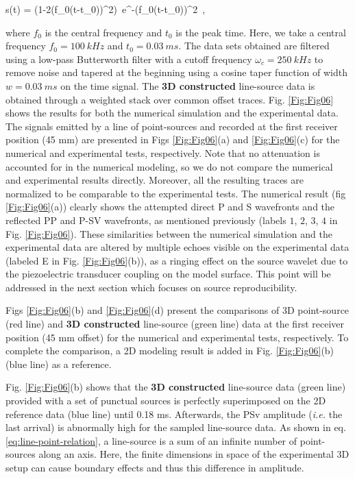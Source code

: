 \documentclass[extra,mreferee]{gji}
\newenvironment{violetnote}{\par\color{BlueViolet}}{\par}
\begin{document}
\begin{violetnote}
\equation
s(t) = (1-2(\pi f_{0}(t-t_{0}))^{2})~e^{-(\pi f_{0}(t-t_{0}))^{2}}~,
\label{eq:ricker-source} 
\endequation

where $f_{0}$ is the central frequency and $t_{0}$ is the peak time. Here, we take a central frequency $f_{0}=100\ kHz$ and $t_{0}=0.03\ ms$. The data sets obtained are filtered using a low-pass Butterworth filter with a cutoff frequency $\omega_{c}=250\ kHz$ to remove noise and tapered at the beginning using a cosine taper function of width $w=0.03\ ms$ on the time signal. The \textbf{3D constructed} line-source data is obtained through a weighted stack over common offset traces. Fig. \ref{Fig:Fig06} shows the results for both the numerical simulation and the experimental data. The signals emitted by a line of point-sources and recorded at the first receiver position (45 mm) are presented in Figs \ref{Fig:Fig06}(a) and \ref{Fig:Fig06}(c) for the numerical and experimental tests, respectively. Note that no attenuation is accounted for in the numerical modeling, so we do not compare the numerical and experimental results directly. Moreover, all the resulting traces are normalized to be comparable to the experimental tests. The numerical result (fig \ref{Fig:Fig06}(a)) clearly shows the attempted direct P and S wavefronts and the reflected PP and P-SV wavefronts, as mentioned previously (labels $1$, $2$, $3$, $4$ in Fig. \ref{Fig:Fig06}). These similarities between the numerical simulation and the experimental data are altered by multiple echoes visible on the experimental data (labeled E in Fig. \ref{Fig:Fig06}(b)), as a ringing effect on the source wavelet due to the piezoelectric transducer coupling on the model surface. This point will be addressed in the next section which focuses on source reproducibility. 

Figs \ref{Fig:Fig06}(b) and \ref{Fig:Fig06}(d) present the comparisons of 3D point-source (red line) and \textbf{3D constructed} line-source (green line) data at the first receiver position (45 mm offset) for the numerical and experimental tests, respectively. To complete the comparison, a 2D modeling result is added in Fig. \ref{Fig:Fig06}(b) (blue line) as a reference.

Fig. \ref{Fig:Fig06}(b) shows that the \textbf{3D constructed} line-source data (green line) provided with a set of punctual sources is perfectly superimposed on the 2D reference data (blue line) until 0.18 ms. Afterwards, the PSv amplitude (\textit{i.e.} the last arrival) is abnormally high for the sampled line-source data. As shown in eq. \ref{eq:line-point-relation}, a line-source is a sum of an infinite number of point-sources along an axis. Here, the finite dimensions in space of the experimental 3D setup can cause boundary effects and thus this difference in amplitude.


\end{violetnote}
\end{document}
